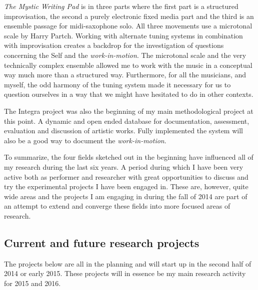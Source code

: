 \documentclass[a4paper]{article}
\begin{document}
\emph{The Mystic Writing Pad} is in three parts where the first part is a structured improvisation, the second a purely electronic fixed media part and the third is an ensemble passage for midi-saxophone solo. All three movements use a microtonal scale by Harry Partch. Working with alternate tuning systems in combination with improvisation creates a backdrop for the investigation of questions concerning the Self and the \emph{work-in-motion}. The microtonal scale and the very technically complex ensemble allowed me to work with the music in a conceptual way much more than a structured way. Furthermore, for all the musicians, and myself, the odd harmony of the tuning system made it necessary for us to question ourselves in a way that we might have hesitated to do in other contexts.

The Integra project was also the beginning of my main methodological project at this point. A dynamic and open ended database for documentation, assessment, evaluation and discussion of artistic works. Fully implemented the system will also be a good way to document the \emph{work-in-motion}.

To summarize, the four fields sketched out in the beginning have influenced all of my research during the last six years. A period during which I have been very active both as performer and researcher with great opportunities to discuss and try the experimental projects I have been engaged in. These are, however, quite wide areas and the projects I am engaging in during the fall of 2014 are part of an attempt to extend and converge these fields into more focused areas of research.


\subsection*{\textsf{Current and future research projects}}

The projects below are all in the planning and will start up in the second half of 2014 or early 2015. These projects will in essence be my main research activity for 2015 and 2016.
\end{document}
